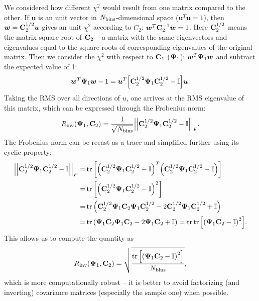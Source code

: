 We considered how different $\chi^2$ would result from one matrix compared to the other.
If $\bm u$ is an unit vector in $N_{\rm bins}$-dimensional space ($\bm u^T \bm u = 1$), then $\bm w = {\bf C}_2^{1/2} \bm u$ gives an unit $\chi^2$ according to $C_2$: $\bm w^T {\bf C}_2^{-1} \bm w=1$.
Here ${\bf C}_2^{1/2}$ means the matrix square root of ${\bf C}_2$ -- a matrix with the same eigenvectors and eigenvalues equal to the square roots of corresponding eigenvalues of the original matrix.
Then we consider the $\chi^2$ with respect to ${\bf C}_1$ (${\bf \Psi}_1$): $\bm w^T {\bf \Psi}_1 \bm w$ and subtract the expected value of 1:
\begin{equation}
\bm w^T {\bf \Psi}_1 \bm w - 1 = \bm u^T {\left[ {\bf C}_2^{1/2} {\bf \Psi}_1 {\bf C}_2^{1/2} - {\bf \mathbb I} \right]} \bm u.
\end{equation}
Taking the RMS over all directions of $u$, one arrives at the RMS eigenvalue of this matrix, which can be expressed through the Frobenius norm:
\begin{equation}
R_{\rm inv} {\left( {\bf \Psi}_1, {\bf C}_2 \right)} = \frac1{\sqrt{N_{\rm bins}}} {\left| {\left| {\bf C}_2^{1/2} {\bf \Psi}_1 {\bf C}_2^{1/2} - {\bf \mathbb I} \right|} \right|}_F.
\end{equation}
The Frobenius norm can be recast as a trace and simplified further using its cyclic property:
\begin{align}
\Abs{\Abs{{\bf C}_2^{1/2} {\bf \Psi}_1 {\bf C}_2^{1/2} - {\bf \mathbb I}}}_F =& \tr \Args{\Arg{{\bf C}_2^{1/2} {\bf \Psi}_1 {\bf C}_2^{1/2} - {\bf \mathbb I}}^T \Arg{{\bf C}_2^{1/2} {\bf \Psi}_1 {\bf C}_2^{1/2} - {\bf \mathbb I}}} \nonumber \\
=& \tr \Args{\Arg{{\bf C}_2^{1/2} {\bf \Psi}_1 {\bf C}_2^{1/2} - {\bf \mathbb I}}^2} \nonumber \\
=& \tr \Arg{{\bf C}_2^{1/2} {\bf \Psi}_1 {\bf C}_2 {\bf \Psi}_1 {\bf C}_2^{1/2} - 2 {\bf C}_2^{1/2} {\bf \Psi}_1 {\bf C}_2^{1/2} + {\bf \mathbb I}} \nonumber \\
=& \tr \Arg{{\bf \Psi}_1 {\bf C}_2 {\bf \Psi}_1 {\bf C}_2 - 2 {\bf \Psi}_1 {\bf C}_2 + {\bf \mathbb I}} = \tr \tr \Args{\Arg{{\bf \Psi}_1 {\bf C}_2 - {\bf \mathbb I}}^2}.
\end{align}
This allows us to compute the quantity as
\begin{equation}
R_{\rm inv} \Arg{{\bf \Psi}_1, {\bf C}_2} = \sqrt{\frac{\tr \Args{\Arg{{\bf \Psi}_1 {\bf C}_2 - {\bf \mathbb I}}^2}}{N_{\rm bins}}},
\end{equation}
which is more computationally robust -- it is better to avoid factorizing (and inverting) covariance matrices (especially the sample one) when possible.

